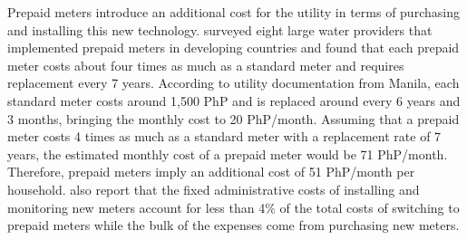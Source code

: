 \documentclass[12pt]{article}
\begin{document}
Prepaid meters introduce an additional cost for the utility in terms of purchasing and installing this new technology.  \cite{heymans2014limits} surveyed eight large water providers that implemented prepaid meters in developing countries and found that each prepaid meter costs about four times as much as a standard meter and requires replacement every 7 years.  According to utility documentation from Manila, each standard meter costs around 1,500 PhP and is replaced around every 6 years and 3 months, bringing the monthly cost to 20 PhP/month.  Assuming that a prepaid meter costs 4 times as much as a standard meter with a replacement rate of 7 years, the estimated monthly cost of a prepaid meter would be 71 PhP/month.  Therefore, prepaid meters imply an additional cost of 51 PhP/month per household.  \cite{heymans2014limits} also report that the fixed administrative costs of installing and monitoring new meters account for less than 4\% of the total costs of switching to prepaid meters while the bulk of the expenses come from purchasing new meters.  
\end{document}
